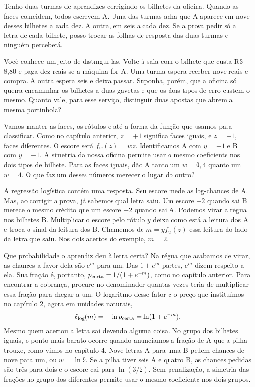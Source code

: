 Tenho duas turmas de aprendizes corrigindo os bilhetes da oficina. Quando as faces coincidem, todos escrevem A. Uma das turmas acha que A aparece em nove desses bilhetes a cada dez. A outra, em seis a cada dez. Se a prova pedir só a letra de cada bilhete, posso trocar as folhas de resposta das duas turmas e ninguém perceberá.

Você conhece um jeito de distingui-las. Volte à sala com o bilhete que custa R\$\,8,80 e paga dez reais se a máquina for A. Uma turma espera receber nove reais e compra. A outra espera seis e deixa passar. Suponha, porém, que a oficina só queira encaminhar os bilhetes a duas gavetas e que os dois tipos de erro custem o mesmo. Quanto vale, para esse serviço, distinguir duas apostas que abrem a mesma portinhola?

Vamos manter as faces, os rótulos e até a forma da função que usamos para classificar. Como no capítulo anterior, $z=+1$ significa faces iguais, e $z=-1$, faces diferentes. O escore será $f_w(z)=wz$. Identificamos A com $y=+1$ e B com $y=-1$. A simetria da nossa oficina permite usar o mesmo coeficiente nos dois tipos de bilhete. Para as faces iguais, dão A tanto um $w=0{,}4$ quanto um $w=4$. O que faz um desses números merecer o lugar do outro?

A regressão logística contém uma resposta. Seu escore mede as log-chances de A. Mas, ao corrigir a prova, já sabemos qual letra saiu. Um escore $-2$ quando sai B merece o mesmo crédito que um escore $+2$ quando sai A. Podemos virar a régua nos bilhetes B. Multiplicar o escore pelo rótulo $y$ deixa como está a leitura dos A e troca o sinal da leitura dos B. Chamemos de $m=yf_w(z)$ essa leitura do lado da letra que saiu. Nos dois acertos do exemplo, $m=2$.

Que probabilidade o aprendiz deu à letra certa? Na régua que acabamos de virar, as chances a favor dela são $e^m$ para um. Das $1+e^m$ partes, $e^m$ dizem respeito a ela. Sua fração é, portanto, $p_{\rm certa}=1/(1+e^{-m})$, como no capítulo anterior. Para encontrar a cobrança, procure no denominador quantas vezes teria de multiplicar essa fração para chegar a um. O logaritmo desse fator é o preço que instituímos no capítulo 2, agora em unidades naturais,
\[
             \ell_{\rm log}(m)=-\ln p_{\rm certa}=\ln(1+e^{-m}).
\]
Mesmo quem acertou a letra sai devendo alguma coisa. No grupo dos bilhetes iguais, o ponto mais barato ocorre quando anunciamos a fração de A que a pilha trouxe, como vimos no capítulo 4. Nove letras A para uma B pedem chances de nove para um, ou $w=\ln 9$. Se a pilha tiver seis A e quatro B, as chances pedidas são três para dois e o escore cai para $\ln(3/2)$. Sem penalização, a simetria das frações no grupo dos diferentes permite usar o mesmo coeficiente nos dois grupos.

